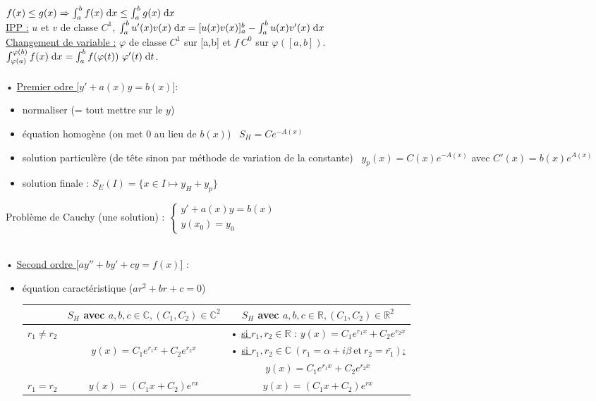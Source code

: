 \documentclass[12 pt]{exampleclass}
\begin{document}
\begin{flushleft}
\begin{doublespace}
	\text{ } \\
	$f(x)\leq g(x) \Rightarrow \int_a^b f(x) \; \text{d}x \leq \int_a^b g(x) \; \text{d}x$ \\
	\underline{IPP :} $u$ et $v$ de classe $C^1$, $\int_a^b u'(x)v(x) \; \text{d}x = [u(x)v(x)]_a^b - \int_a^b u(x)v'(x) \; \text{d}x$
	\text{ } \\
	\underline{Changement de variable :} $\varphi$ de classe $C^1$ sur [a,b] et $f \ C^0$ sur $\varphi([a,b])$. \\
	$\int_{\varphi(a)}^{\varphi(b)} f(x) \; \text{d}x = \int_a^b f(\varphi(t)) \ \varphi'(t) \; \text{d}t$.\\
	\text{ } \\
	• \underline{Premier odre [$y'+ a(x)y=b(x)]$}:
	\begin{itemize}
		\item normaliser (= tout mettre sur le $y$)
		\item équation homogène (on met 0 au lieu de $b(x)$) \ $S_H = C e^{-A(x)}$
		\item solution particulère (de tête sinon par méthode de variation de la constante) \ $y_p (x) = C(x) e^{-A(x)}$ avec $C'(x)=b(x) e^{A(x)}$
		\item solution finale : $S_E (I) = \{ x\in I \mapsto y_H+y_p\}$
	\end{itemize}
	Problème de Cauchy (une solution) :  $ \left\{\begin{array}{ll} y' + a(x)y = b(x) \\  y(x_0) = y_0 \end{array} \right.$
	
	\text{ } \\
	• \underline{Second ordre [$ay'' + by' + cy = f(x)$]} :
	\begin{itemize}
		\item équation caractéristique ($ a r^2 + b r + c = 0$)
		\begin{tabular}{|c|c|c|}
		\hline
		 & $S_H$ avec $a,b,c \in \mathbb{C}, (C_1,C_2)\in \mathbb{C}^2$ & $S_H$ avec $a,b,c \in \mathbb{R}, (C_1,C_2)\in \mathbb{R}^2$  \\
		\hline
		$r_1 \ne r_2$ &  & • \underline{si $r_1,r_2 \in \mathbb{R}$} : $y(x) = C_1 e^{r_1 x} + C_2 e^{r_2 x}$ \\ 
		& $y(x)=C_1 e^{r_1 x} + C_2 e^{r_2 x}$ & • \underline{si $r_1,r_2 \in \mathbb{C}\ (r_1=\alpha + i \beta \  \text{et} \  r_2 = \bar{r_1} )$:} \\
		& & $y(x) = C_1 e^{r_1 x} + C_2 e^{r_2 x}$  \\
		\hline
		$r_1 = r_2$ & $y(x) = (C_1 x + C_2) e^{r x}$ & $y(x) = (C_1 x + C_2) e^{r x}$ \\
		\hline
		\end{tabular}
		

\end{itemize}
\end{doublespace}
\end{flushleft}
\end{document}
